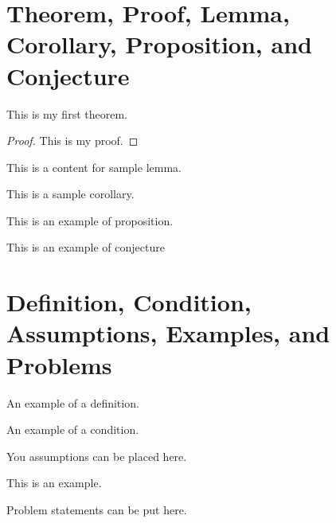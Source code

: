\section{Theorem, Proof, Lemma, Corollary, Proposition, and Conjecture}
\label{sec:theorem}
\begin{theorem}
  \label{thm:th1}
  This is my first theorem.
\end{theorem}

\begin{proof}
  \label{prf:pr1}
  This is my proof.
\end{proof}

\begin{lemma}
  \label{lem:lem1}
  This is a content for sample lemma. 
\end{lemma}

\begin{corollary}
  \label{cor:cor1}
  This is a sample corollary.
\end{corollary}

\begin{proposition}
  \label{prp:prop1}
  This is an example of proposition.
\end{proposition}

\begin{conjecture}
  \label{cnj:conj1}
  This is an example of conjecture
\end{conjecture}

\section{Definition, Condition, Assumptions, Examples, and Problems}
\label{sec:defn}

\begin{definition}
  \label{def:defn1}
  An example of a definition.
\end{definition}

\begin{condition}
  \label{con:cond1}
  An example of a condition.
\end{condition}

\begin{assumption}
  \label{asm:assum1}
  You assumptions can be placed here.
\end{assumption}

\begin{example}
  \label{exm:example1}
  This is an example.
\end{example}

\begin{problem}
  \label{pbl:problem1}
  Problem statements can be put here.
\end{problem}

